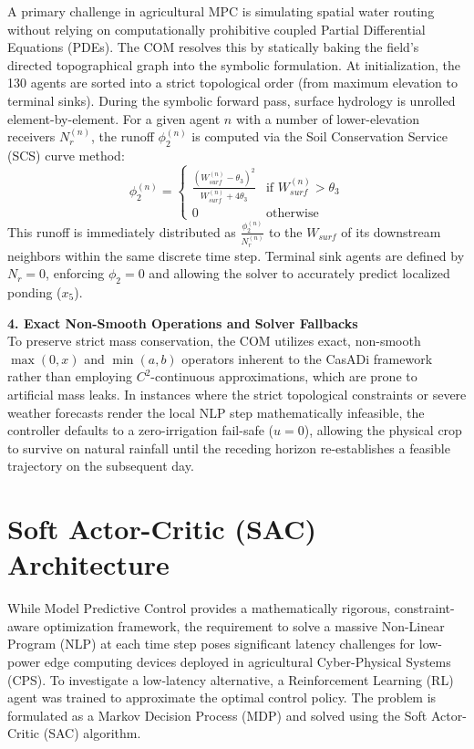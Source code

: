 \documentclass[11pt, a4paper]{article}
\begin{document}
A primary challenge in agricultural MPC is simulating spatial water routing without relying on computationally prohibitive coupled Partial Differential Equations (PDEs). The COM resolves this by statically baking the field's directed topographical graph into the symbolic formulation. At initialization, the 130 agents are sorted into a strict topological order (from maximum elevation to terminal sinks). During the symbolic forward pass, surface hydrology is unrolled element-by-element. For a given agent $n$ with a number of lower-elevation receivers $N_r^{(n)}$, the runoff $\phi_2^{(n)}$ is computed via the Soil Conservation Service (SCS) curve method:
\begin{equation}
    \phi_2^{(n)} = 
    \begin{cases} 
        \frac{(W_{surf}^{(n)} - \theta_3)^2}{W_{surf}^{(n)} + 4\theta_3} & \text{if } W_{surf}^{(n)} > \theta_3 \\
        0 & \text{otherwise}
    \end{cases}
\end{equation}
This runoff is immediately distributed as $\frac{\phi_2^{(n)}}{N_r^{(n)}}$ to the $W_{surf}$ of its downstream neighbors within the same discrete time step. Terminal sink agents are defined by $N_r = 0$, enforcing $\phi_2 = 0$ and allowing the solver to accurately predict localized ponding ($x_5$).

\textbf{4. Exact Non-Smooth Operations and Solver Fallbacks} \\
To preserve strict mass conservation, the COM utilizes exact, non-smooth $\max(0, x)$ and $\min(a,b)$ operators inherent to the CasADi framework rather than employing $C^2$-continuous approximations, which are prone to artificial mass leaks. In instances where the strict topological constraints or severe weather forecasts render the local NLP step mathematically infeasible, the controller defaults to a zero-irrigation fail-safe ($u = 0$), allowing the physical crop to survive on natural rainfall until the receding horizon re-establishes a feasible trajectory on the subsequent day.

\section{Soft Actor-Critic (SAC) Architecture}

While Model Predictive Control provides a mathematically rigorous, constraint-aware optimization framework, the requirement to solve a massive Non-Linear Program (NLP) at each time step poses significant latency challenges for low-power edge computing devices deployed in agricultural Cyber-Physical Systems (CPS). To investigate a low-latency alternative, a Reinforcement Learning (RL) agent was trained to approximate the optimal control policy. The problem is formulated as a Markov Decision Process (MDP) and solved using the Soft Actor-Critic (SAC) algorithm.
\end{document}
